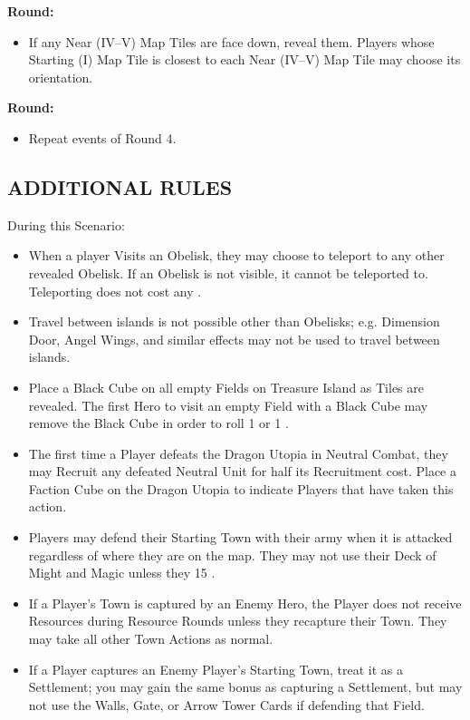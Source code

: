 \begin{multicols*}{2}
\textbf{ Round:}
\begin{itemize}
  \item If any Near (IV--V) Map Tiles are face down, reveal them. Players whose Starting (I) Map Tile is closest to each Near (IV--V) Map Tile may choose its orientation.
\end{itemize}

\textbf{ Round:}
\begin{itemize}
  \item Repeat events of Round 4.
\end{itemize}

\subsection*{\MakeUppercase{Additional Rules}}

During this Scenario:

\begin{itemize}
  \item When a player Visits an Obelisk, they may choose to teleport to any other revealed Obelisk. If an Obelisk is not visible, it cannot be teleported to. Teleporting does not cost any .
  \item Travel between islands is not possible other than Obelisks; e.g. Dimension Door, Angel Wings, and similar effects may not be used to travel between islands.
  \item Place a Black Cube on all empty Fields on Treasure Island as Tiles are revealed. The first Hero to visit an empty Field with a Black Cube may remove the Black Cube in order to roll 1  or 1 .
  \item The first time a Player defeats the Dragon Utopia in Neutral Combat, they may Recruit any defeated Neutral Unit for half its Recruitment cost. Place a Faction Cube on the Dragon Utopia to indicate Players that have taken this action.
  \item Players may defend their Starting Town with their army when it is attacked regardless of where they are on the map. They may not use their Deck of Might and Magic unless they  15 .
  \item If a Player's Town is captured by an Enemy Hero, the Player does not receive Resources during Resource Rounds unless they recapture their Town. They may take all other Town Actions as normal.
  \item If a Player captures an Enemy Player's Starting Town, treat it as a Settlement; you may gain the same bonus as capturing a Settlement, but may not use the Walls, Gate, or Arrow Tower Cards if defending that Field.
\end{itemize}

\vspace*{\fill}


\end{multicols*}

